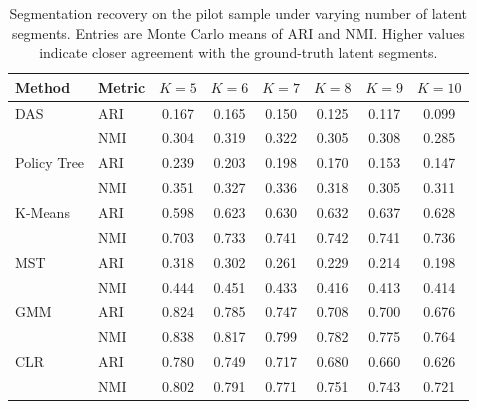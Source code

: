 \begin{table}[htbp]
\centering
\caption{Segmentation recovery on the pilot sample under varying number of latent segments. Entries are Monte Carlo means of ARI and NMI. Higher values indicate closer agreement with the ground-truth latent segments.}
\label{tab:app-ari-nmi-varying-K}
\begin{tabular}{llcccccc}
\toprule
Method & Metric & $K=5$ & $K=6$ & $K=7$ & $K=8$ & $K=9$ & $K=10$ \\
\midrule
DAS & ARI & 0.167 & 0.165 & 0.150 & 0.125 & 0.117 & 0.099 \\
 & NMI & 0.304 & 0.319 & 0.322 & 0.305 & 0.308 & 0.285 \\
\addlinespace
Policy Tree & ARI & 0.239 & 0.203 & 0.198 & 0.170 & 0.153 & 0.147 \\
 & NMI & 0.351 & 0.327 & 0.336 & 0.318 & 0.305 & 0.311 \\
\addlinespace
K-Means & ARI & 0.598 & 0.623 & 0.630 & 0.632 & 0.637 & 0.628 \\
 & NMI & 0.703 & 0.733 & 0.741 & 0.742 & 0.741 & 0.736 \\
\addlinespace
MST & ARI & 0.318 & 0.302 & 0.261 & 0.229 & 0.214 & 0.198 \\
 & NMI & 0.444 & 0.451 & 0.433 & 0.416 & 0.413 & 0.414 \\
\addlinespace
GMM & ARI & 0.824 & 0.785 & 0.747 & 0.708 & 0.700 & 0.676 \\
 & NMI & 0.838 & 0.817 & 0.799 & 0.782 & 0.775 & 0.764 \\
\addlinespace
CLR & ARI & 0.780 & 0.749 & 0.717 & 0.680 & 0.660 & 0.626 \\
 & NMI & 0.802 & 0.791 & 0.771 & 0.751 & 0.743 & 0.721 \\
\bottomrule
\end{tabular}
\end{table}
